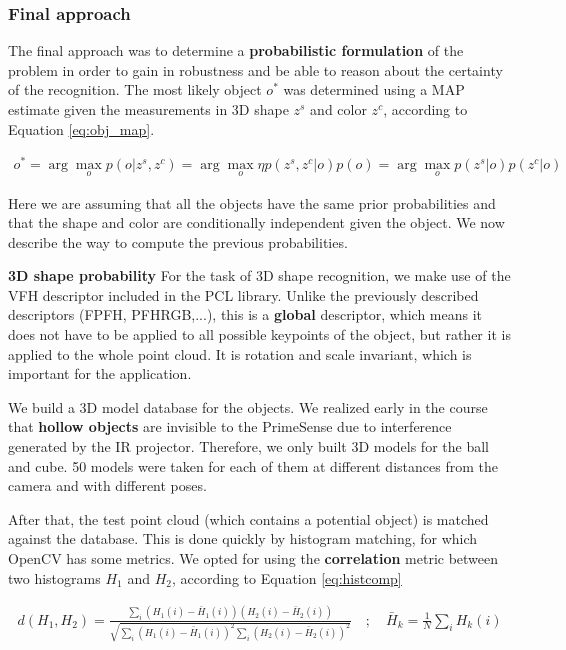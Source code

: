 \subsubsection{Final approach}
The final approach was to determine a \textbf{probabilistic formulation} of the problem in order to gain in robustness and be able to reason about the certainty of the recognition. The most likely object $o^*$ was determined using a MAP estimate given the measurements in 3D shape $z^s$ and color $z^c$, according to Equation \ref{eq:obj_map}.

\begin{align}
\label{eq:obj_map}
o^* = \arg\max_o p(o|z^s, z^c) = \arg\max_o \eta p(z^s, z^c|o) p(o) = \arg\max_o p(z^s|o)p(z^c|o)
\end{align}

Here we are assuming that all the objects have the same prior probabilities and that the shape and color are conditionally independent given the object. 
We now describe the way to compute the previous probabilities.

\textbf{3D shape probability}
For the task of 3D shape recognition, we make use of the VFH descriptor included in the PCL library. Unlike the previously described descriptors (FPFH, PFHRGB,...), this is a \textbf{global} descriptor, which means it does not have to be applied to all possible keypoints of the object, but rather it is applied to the whole point cloud. It is rotation and scale invariant, which is important for the application. 

We build a 3D model database for the objects. We realized early in the course that \textbf{hollow objects} are invisible to the PrimeSense due to interference generated by the IR projector. Therefore, we only built 3D models for the ball and cube. 50 models were taken for each of them at different distances from the camera and with different poses. 

After that, the test point cloud (which contains a potential object) is matched against the database. This is done quickly by histogram matching, for which OpenCV has some metrics. We opted for using the \textbf{correlation} metric between two histograms $H_1$ and $H_2$, according to Equation \ref{eq:histcomp}


\begin{align}
d(H_1, H_2) = \frac{\sum_i (H_1(i) - \bar{H}_1(i))(H_2(i)-\bar{H}_2(i))}{\sqrt{\sum_i(H_1(i) - \bar{H}_1(i))^2\sum_i(H_2(i) - \bar{H}_2(i))^2}}
\quad ; \quad
\bar{H}_k = \frac{1}{N}\sum_i H_k(i)
\end{align}

